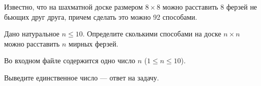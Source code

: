 Известно, что на шахматной доске размером $8 \times 8$ можно расставить 8 ферзей не бьющих друг друга, причем сделать это можно 92 способами.

Дано натуральное $n \leq 10$. Определите сколькими способами на доске $n \times n$ можно расставить $n$ мирных ферзей. 

\InputFile

Во входном файле содержится одно число $n$ ($1\leqslant n \leqslant 10$).

\OutputFile

Выведите единственное число --- ответ на задачу.
